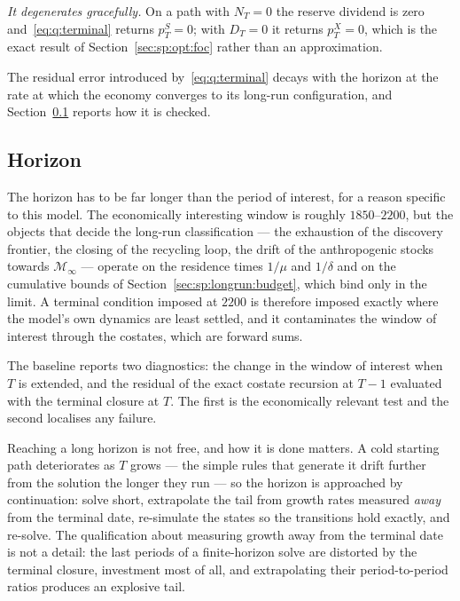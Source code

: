 \emph{It degenerates gracefully.} On a path with $N_T=0$ the reserve dividend is zero and~\eqref{eq:q:terminal} returns $p^S_T=0$; with $D_T=0$ it returns $p^X_T=0$, which is the exact result of Section~\ref{sec:sp:opt:foc} rather than an approximation.

The residual error introduced by~\eqref{eq:q:terminal} decays with the horizon at the rate at which the economy converges to its long-run configuration, and Section~\ref{sec:q:sol:horizon} reports how it is checked.

\subsection{Horizon}\label{sec:q:sol:horizon}

The horizon has to be far longer than the period of interest, for a reason specific to this model. The economically interesting window is roughly $1850$--$2200$, but the objects that decide the long-run classification --- the exhaustion of the discovery frontier, the closing of the recycling loop, the drift of the anthropogenic stocks towards $\mathcal M_\infty$ --- operate on the residence times $1/\mu$ and $1/\delta$ and on the cumulative bounds of Section~\ref{sec:sp:longrun:budget}, which bind only in the limit. A terminal condition imposed at $2200$ is therefore imposed exactly where the model's own dynamics are least settled, and it contaminates the window of interest through the costates, which are forward sums.

The baseline reports two diagnostics: the change in the window of interest when $T$ is extended, and the residual of the exact costate recursion at $T-1$ evaluated with the terminal closure at $T$. The first is the economically relevant test and the second localises any failure.

Reaching a long horizon is not free, and how it is done matters. A cold starting path deteriorates as $T$ grows --- the simple rules that generate it drift further from the solution the longer they run --- so the horizon is approached by continuation: solve short, extrapolate the tail from growth rates measured \emph{away} from the terminal date, re-simulate the states so the transitions hold exactly, and re-solve. The qualification about measuring growth away from the terminal date is not a detail: the last periods of a finite-horizon solve are distorted by the terminal closure, investment most of all, and extrapolating their period-to-period ratios produces an explosive tail.

